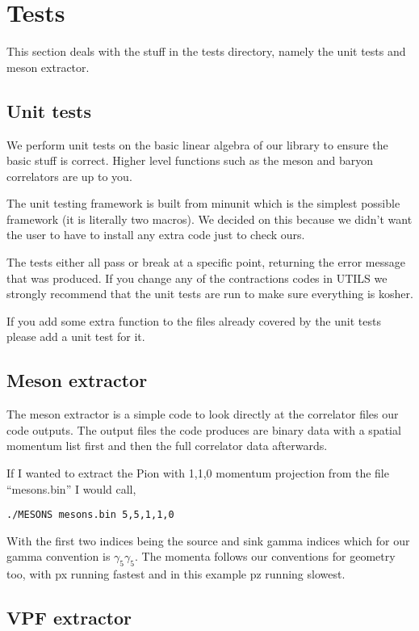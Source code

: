 \section{Tests}

This section deals with the stuff in the tests directory, namely
the unit tests and meson extractor.

\subsection{Unit tests}

We perform unit tests on the basic linear algebra of our library
to ensure the basic stuff is correct. Higher level functions
such as the meson and baryon correlators are up to you.

The unit testing framework is built from minunit %
which is the simplest possible framework (it is literally
two macros). We decided on this because we didn't want the user
to have to install any extra code just to check ours.

The tests either all pass or break at a specific point, returning 
the error message that was produced. If you change any of the
contractions codes in UTILS we strongly recommend that the
unit tests are run to make sure everything is kosher.

If you add some extra function to the files already covered by
the unit tests please add a unit test for it.

\subsection{Meson extractor}

The meson extractor is a simple code to look directly at the
correlator files our code outputs. The output files the code
produces are binary data with a spatial momentum list first and
then the full correlator data afterwards.

If I wanted to extract the Pion with 1,1,0 momentum projection
from the file ``mesons.bin'' I would call,
\begin{verbatim}
./MESONS mesons.bin 5,5,1,1,0
\end{verbatim}
With the first two indices being the source and sink gamma indices
which for our gamma convention is $\gamma_5 \gamma_5$. The momenta
follows our conventions for geometry too, with px running fastest
and in this example pz running slowest.

\subsection{VPF extractor}


